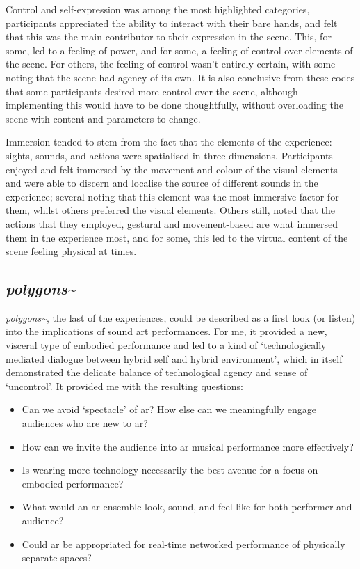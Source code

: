 Control and self-expression was among the most highlighted categories, participants appreciated the ability to interact with their bare hands, and felt that this was the main contributor to their expression in the scene. This, for some, led to a feeling of power, and for some, a feeling of control over elements of the scene. For others, the feeling of control wasn't entirely certain, with some noting that the scene had agency of its own. It is also conclusive from these codes that some participants desired more control over the scene, although implementing this would have to be done thoughtfully, without overloading the scene with content and parameters to change.

Immersion tended to stem from the fact that the elements of the experience: sights, sounds, and actions were spatialised in three dimensions. Participants enjoyed and felt immersed by the movement and colour of the visual elements and were able to discern and localise the source of different sounds in the experience; several noting that this element was the most immersive factor for them, whilst others preferred the visual elements. Others still, noted that the actions that they employed, gestural and movement-based are what immersed them in the experience most, and for some, this led to the virtual content of the scene feeling physical at times.

\subsection{\textit{polygons\textasciitilde{}}}
\textit{polygons\textasciitilde{}}, the last of the experiences, could be described as a first look (or listen) into the implications of sound \gls{art} performances. For me, it provided a new, visceral type of embodied performance and led to a kind of `technologically mediated dialogue between hybrid self and hybrid environment', which in itself demonstrated the delicate balance of technological agency and sense of `uncontrol'. It provided me with the resulting questions: 
\begin{itemize}
    \item Can we avoid `spectacle' of \gls{ar}? How else can we meaningfully engage audiences who are new to \gls{ar}?
    \item How can we invite the audience into \gls{ar} musical performance more effectively?
    \item Is wearing more technology necessarily the best avenue for a focus on embodied performance?
    \item What would an \gls{ar} ensemble look, sound, and feel like for both performer and audience?
    \item Could \gls{ar} be appropriated for real-time networked performance of physically separate spaces?
\end{itemize}

